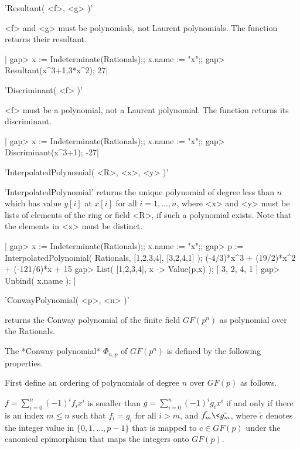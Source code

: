 
'Resultant( <f>, <g> )'

<f>  and <g>  must be  polynomials, not  Laurent polynomials.  The function
returns their resultant.

|    gap> x := Indeterminate(Rationals);; x.name := "x";;
    gap> Resultant(x^3+1,3*x^2);
    27|
  

'Discriminant( <f> )'

<f>  must be a  polynomial, not a  Laurent polynomial. The function returns
its discriminant.

|    gap> x := Indeterminate(Rationals);; x.name := "x";;
    gap> Discriminant(x^3+1);
    -27|


'InterpolatedPolynomial( <R>, <x>, <y> )'

'InterpolatedPolynomial'  returns the unique   polynomial of  degree less
than $n$ which has value $y[i]$ at $x[i]$ for  all $i=1,...,n$, where <x>
and <y> must  be lists of elements  of the ring or  field <R>, if such  a
polynomial exists.  Note that the elements in <x> must be distinct.

|    gap> x := Indeterminate(Rationals);; x.name := "x";;
    gap> p := InterpolatedPolynomial( Rationals, [1,2,3,4], [3,2,4,1] );
    (-4/3)*x^3 + (19/2)*x^2 + (-121/6)*x + 15
    gap> List( [1,2,3,4], x -> Value(p,x) );
    [ 3, 2, 4, 1 ] 
    gap> Unbind( x.name ); |


'ConwayPolynomial( <p>, <n> )'

returns the Conway polynomial of the finite field $GF(p^n)$ as
polynomial over the Rationals.

The *Conway polynomial* $\Phi_{n,p}$ of $GF(p^n)$ is defined by the
following properties.

First define an ordering of polynomials of degree $n$ over $GF(p)$ as
follows.

$f = \sum_{i=0}^n (-1)^i f_i x^i$ is smaller than
$g = \sum_{i=0}^n (-1)^i g_i x^i$ if and only if there is an index
$m \leq n$ such that $f_i = g_i$ for all $i > m$, and
$\tilde{f_m} \< \tilde{g_m}$, where $\tilde{c}$ denotes the integer
value in $\{ 0, 1, \ldots, p-1 \}$ that is mapped to $c\in GF(p)$ under
the canonical epimorphism that maps the integers onto $GF(p)$.

